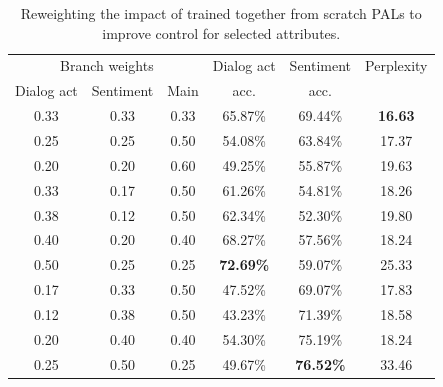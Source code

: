\documentclass[11pt]{article}
\begin{document}
\begin{table}[ht]
\fontsize{9}{11}
\selectfont 
\centering
\begin{tabular}{cccccc}
\hline
\multicolumn{3}{c}{Branch weights} & Dialog act & Sentiment & Perplexity \\
Dialog act   & Sentiment & Main  & acc.       & acc.      &            \\ \hline
0.33          & 0.33       & 0.33   & 65.87\%    & 69.44\%   & \textbf{16.63}      \\
0.25          & 0.25       & 0.50   & 54.08\%    & 63.84\%   & 17.37      \\
0.20          & 0.20       & 0.60   & 49.25\%    & 55.87\%   & 19.63      \\ \hline
0.33          & 0.17       & 0.50   & 61.26\%    & 54.81\%   & 18.26      \\
0.38          & 0.12       & 0.50   & 62.34\%    & 52.30\%   & 19.80      \\
0.40          & 0.20       & 0.40   & 68.27\%    & 57.56\%   & 18.24      \\
0.50          & 0.25       & 0.25   & \textbf{72.69\%}    & 59.07\%   & 25.33      \\
\hline
0.17          & 0.33       & 0.50   & 47.52\%    & 69.07\%   & 17.83      \\
0.12          & 0.38       & 0.50   & 43.23\%    & 71.39\%   & 18.58      \\ 
0.20          & 0.40       & 0.40   & 54.30\%    & 75.19\%   & 18.24      \\
0.25          & 0.50       & 0.25   & 49.67\%    & \textbf{76.52\%} & 33.46 \\
\hline
\end{tabular}
\caption{Reweighting the impact of trained together from scratch PALs to improve control for selected attributes.}
\label{reweighting_no_transfer}
\end{table}
\end{document}
